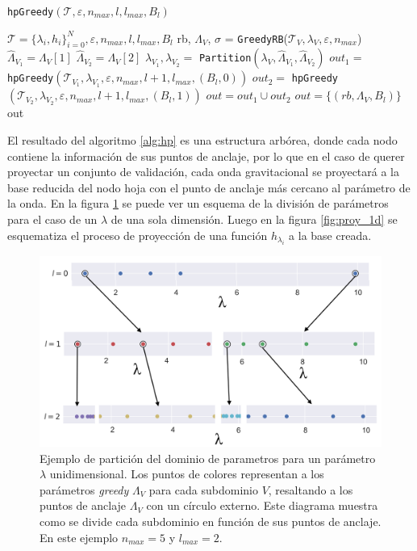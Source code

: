 
\begin{algorithm}
\caption{\texttt{hpGreedy}\((\mathcal{T}, \varepsilon, n_{max}, l, l_{max}, B_{l})\)}\label{alg:hp}
\begin{algorithmic}[1]
\Require $\mathcal{T} = \{ \lambda_{i}, h_{i} \}_{i=0}^N, \varepsilon, n_{max},l, l_{max}, B_{l}$ 
\vspace{3mm}
\State rb, $\Lambda_V$, $\sigma$ = \texttt{GreedyRB}($\mathcal{T}_V,\lambda_V, \varepsilon, n_{max}$) 
\vspace{3mm}
	\State $\hat{\Lambda}_{V_1} = \Lambda_V[1]$
	\State $\hat{\Lambda}_{V_2} = \Lambda_V[2]$
	\State $\lambda_{V_1}, \lambda_{V_2} =$ \texttt{Partition}$(\lambda_V,\hat{\Lambda}_{V_1}, \hat{\Lambda}_{V_2})$
	\State $out_1 = $ \texttt{hpGreedy}\((\mathcal{T}_{V_1}, \lambda_{V_1}, \varepsilon, n_{max}, l+1, l_{max}, (B_{l}, 0))\)
	\State $out_2 = $ \texttt{hpGreedy}\((\mathcal{T}_{V_2} ,\lambda_{V_2}, \varepsilon, n_{max}, l+1, l_{max}, (B_{l}, 1))\)
	\State $out = out_1 \cup out_2$
\Else
	\State $out = \{( rb, \Lambda_V, B_l)\}$
\EndIf
\vspace{3mm}
\Ensure out
\end{algorithmic}
\end{algorithm}

El resultado del algoritmo \ref{alg:hp} es una estructura arbórea, donde cada nodo contiene la información de sus puntos de anclaje, por lo que en el caso de querer proyectar un conjunto de validación, cada onda gravitacional se proyectará a la base reducida del nodo hoja con el punto de anclaje más cercano al parámetro de la onda. En la figura \ref{fig:part_1d} se puede ver un esquema de la división de parámetros para el caso de un $\lambda$ de una sola dimensión. Luego en la figura \ref{fig:proy_1d} se esquematiza el proceso de proyección de una función $h_{\lambda_i}$ a la base creada.

\begin{figure}[h!]
\centering
\includegraphics[width=0.75\columnwidth]{figs/particion_parametros_1d.png}
\caption{Ejemplo de partición del dominio de parametros para un parámetro $\lambda$ unidimensional. Los puntos de colores representan a los parámetros \textit{greedy} $\Lambda_V$ para cada subdominio $V$, resaltando a los puntos de anclaje $\Lambda_V$ con un círculo externo. Este diagrama muestra como se divide cada subdominio en función de sus puntos de anclaje. En este ejemplo $n_{max} = 5$ y $l_{max}=2$.}
\label{fig:part_1d}
\end{figure}

